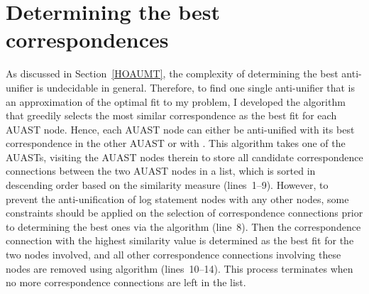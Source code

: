 







\section{Determining the best correspondences}  \label{best-corr}


As discussed in Section~\ref{HOAUMT}, the complexity of determining the best anti-unifier is undecidable in general. Therefore, to find one single anti-unifier that is an approximation of the optimal fit to my problem, I developed the  algorithm that greedily selects the most similar correspondence as the best fit for each AUAST node. Hence, each AUAST node can either be anti-unified with its best correspondence in the other AUAST or with \nothing. This algorithm takes one of the AUASTs, visiting the AUAST nodes therein to store all candidate correspondence connections between the two AUAST nodes in a list, which is sorted in descending order based on the similarity measure (lines~1--9). However, to prevent the anti-unification of log statement nodes with any other nodes, some constraints should be applied on the selection of correspondence connections prior to determining the best ones via the  algorithm (line~8). Then the correspondence connection with the highest similarity value is determined as the best fit for the two nodes involved, and all other correspondence connections involving these nodes are removed using  algorithm (lines~10--14). This process terminates when no more correspondence connections are left in the list.

